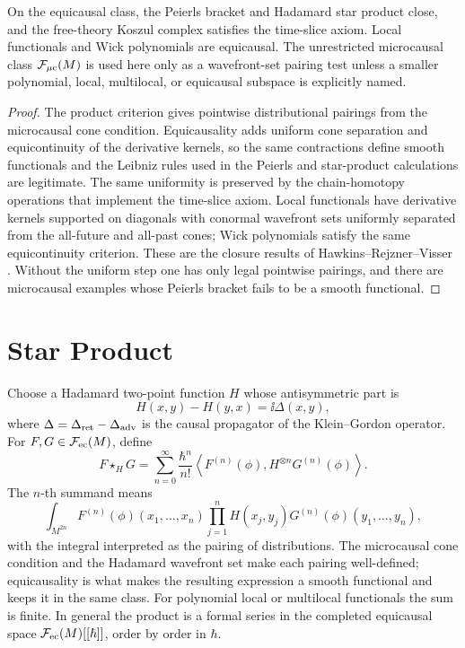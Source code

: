\begin{theorem}
\label{thm:paqft-functional-space-contract}
On the equicausal class, the Peierls bracket and Hadamard star product close,
and the free-theory Koszul complex satisfies the time-slice axiom.  Local
functionals and Wick polynomials are equicausal.  The unrestricted
microcausal class \(\mathcal F_{\mu{\rm c}}(M)\) is used here only as a
wavefront-set pairing test unless a smaller polynomial, local, multilocal, or
equicausal subspace is explicitly named.
\end{theorem}

\begin{proof}
The product criterion gives pointwise distributional pairings from the
microcausal cone condition.  Equicausality adds uniform cone separation and
equicontinuity of the derivative kernels, so the same contractions define
smooth functionals and the Leibniz rules used in the Peierls and star-product
calculations are legitimate.  The same uniformity is preserved by the
chain-homotopy operations that implement the time-slice axiom.  Local
functionals have derivative kernels supported on diagonals with conormal
wavefront sets uniformly separated from the all-future and all-past cones;
Wick polynomials satisfy the same equicontinuity criterion.  These are the
closure results of Hawkins--Rejzner--Visser
\cite{HawkinsRejznerVisser2024Equicausal}.  Without the uniform step one has
only legal pointwise pairings, and there are microcausal examples whose Peierls
bracket fails to be a smooth functional.
\end{proof}

\section{Star Product}

Choose a Hadamard two-point function \(H\) whose antisymmetric part is
\[
  H(x,y)-H(y,x)=\ii\Delta(x,y),
\]
where \(\Delta=\Delta_{\rm ret}-\Delta_{\rm adv}\) is the causal propagator
of the Klein--Gordon operator.  For \(F,G\in\mathcal F_{\rm ec}(M)\),
define
\begin{equation}
  F\star_H G
  =
  \sum_{n=0}^{\infty}
  \frac{\hbar^n}{n!}
  \left\langle
    F^{(n)}(\phi), H^{\otimes n}G^{(n)}(\phi)
  \right\rangle .
  \label{eq:paqft-star-product-expanded}
\end{equation}
The \(n\)-th summand means
\begin{equation}
  \int_{M^{2n}}
    F^{(n)}(\phi)(x_1,\ldots,x_n)
    \prod_{j=1}^n H(x_j,y_j)
    G^{(n)}(\phi)(y_1,\ldots,y_n),
  \label{eq:paqft-star-product-kernel}
\end{equation}
with the integral interpreted as the pairing of distributions.  The
microcausal cone condition and the Hadamard wavefront set make each pairing
well-defined; equicausality is what makes the resulting expression a smooth
functional and keeps it in the same class.  For polynomial local or
multilocal functionals the sum is finite.  In general the product is a
formal series in the completed equicausal space
\(\mathcal F_{\rm ec}(M)[[\hbar]]\), order by order in \(\hbar\).

